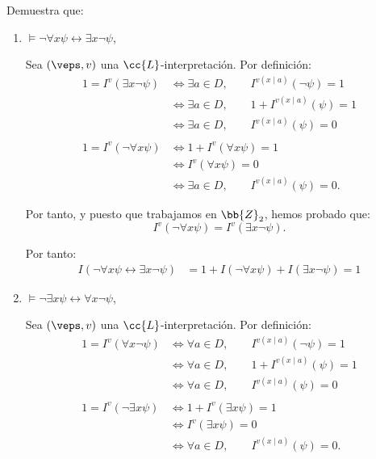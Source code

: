 \setcounter{ejercicio}{5}
\begin{ejercicio}\label{ej:2.6}
    Demuestra que:
    \begin{enumerate}
        \item $\models \neg \forall x \psi \leftrightarrow \exists x \neg \psi$,
        
        Sea $(\veps,v)$ una $\cc{L}$-interpretación. Por definición:
        \begin{align*}
            1 = I^v(\exists x \neg \psi)
            &\iff \exists a\in D,\qquad I^{v(x\mid a)}(\neg \psi) = 1\\
            &\iff \exists a\in D,\qquad 1+I^{v(x\mid a)}(\psi) = 1\\
            &\iff \exists a\in D,\qquad I^{v(x\mid a)}(\psi) = 0\\\\
            1 = I^v(\neg \forall x \psi)
            &\iff 1+I^v(\forall x \psi) = 1\\
            &\iff I^{v}( \forall x \psi) = 0\\
            &\iff \exists a\in D,\qquad I^{v(x\mid a)}(\psi) = 0.
        \end{align*}

        Por tanto, y puesto que trabajamos en $\bb{Z}_2$, hemos probado que:
        \begin{equation*}
            I^v(\neg \forall x \psi) =I^v(\exists x \neg \psi).
        \end{equation*}

        Por tanto:
        \begin{align*}
            I( \neg \forall x \psi \leftrightarrow \exists x \neg \psi)
            &= 1+I(\neg \forall x \psi)+I(\exists x \neg \psi)=1
        \end{align*}
        \item $\models \neg \exists x \psi \leftrightarrow \forall x \neg \psi$,
        
        Sea $(\veps,v)$ una $\cc{L}$-interpretación. Por definición:
        \begin{align*}
            1 = I^v(\forall x \neg \psi)
            &\iff \forall a\in D,\qquad I^{v(x\mid a)}(\neg \psi) = 1\\
            &\iff \forall a\in D,\qquad 1+I^{v(x\mid a)}(\psi) = 1\\
            &\iff \forall a\in D,\qquad I^{v(x\mid a)}(\psi) = 0\\\\
            1 = I^v(\neg \exists x \psi)
            &\iff 1+I^v(\exists x \psi) = 1\\
            &\iff I^{v}( \exists x \psi) = 0\\
            &\iff \forall a\in D,\qquad I^{v(x\mid a)}(\psi) = 0.
        \end{align*}


\end{enumerate}
\end{ejercicio}
